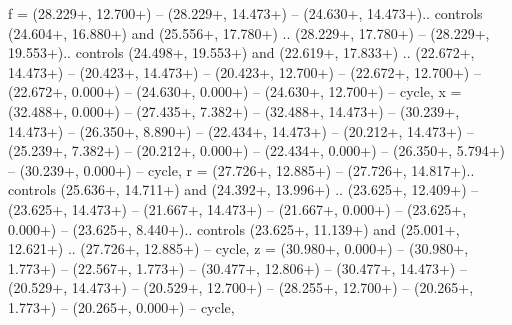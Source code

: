 {f} = {(28.229+\ctpXshift, 12.700+\ctpYshift) -- (28.229+\ctpXshift, 14.473+\ctpYshift) -- (24.630+\ctpXshift, 14.473+\ctpYshift).. controls (24.604+\ctpXshift, 16.880+\ctpYshift) and (25.556+\ctpXshift, 17.780+\ctpYshift) .. (28.229+\ctpXshift, 17.780+\ctpYshift) -- (28.229+\ctpXshift, 19.553+\ctpYshift).. controls (24.498+\ctpXshift, 19.553+\ctpYshift) and (22.619+\ctpXshift, 17.833+\ctpYshift) .. (22.672+\ctpXshift, 14.473+\ctpYshift) -- (20.423+\ctpXshift, 14.473+\ctpYshift) -- (20.423+\ctpXshift, 12.700+\ctpYshift) -- (22.672+\ctpXshift, 12.700+\ctpYshift) -- (22.672+\ctpXshift, 0.000+\ctpYshift) -- (24.630+\ctpXshift, 0.000+\ctpYshift) -- (24.630+\ctpXshift, 12.700+\ctpYshift) -- cycle},
{x} = {(32.488+\ctpXshift, 0.000+\ctpYshift) -- (27.435+\ctpXshift, 7.382+\ctpYshift) -- (32.488+\ctpXshift, 14.473+\ctpYshift) -- (30.239+\ctpXshift, 14.473+\ctpYshift) -- (26.350+\ctpXshift, 8.890+\ctpYshift) -- (22.434+\ctpXshift, 14.473+\ctpYshift) -- (20.212+\ctpXshift, 14.473+\ctpYshift) -- (25.239+\ctpXshift, 7.382+\ctpYshift) -- (20.212+\ctpXshift, 0.000+\ctpYshift) -- (22.434+\ctpXshift, 0.000+\ctpYshift) -- (26.350+\ctpXshift, 5.794+\ctpYshift) -- (30.239+\ctpXshift, 0.000+\ctpYshift) -- cycle},
{r} = {(27.726+\ctpXshift, 12.885+\ctpYshift) -- (27.726+\ctpXshift, 14.817+\ctpYshift).. controls (25.636+\ctpXshift, 14.711+\ctpYshift) and (24.392+\ctpXshift, 13.996+\ctpYshift) .. (23.625+\ctpXshift, 12.409+\ctpYshift) -- (23.625+\ctpXshift, 14.473+\ctpYshift) -- (21.667+\ctpXshift, 14.473+\ctpYshift) -- (21.667+\ctpXshift, 0.000+\ctpYshift) -- (23.625+\ctpXshift, 0.000+\ctpYshift) -- (23.625+\ctpXshift, 8.440+\ctpYshift).. controls (23.625+\ctpXshift, 11.139+\ctpYshift) and (25.001+\ctpXshift, 12.621+\ctpYshift) .. (27.726+\ctpXshift, 12.885+\ctpYshift) -- cycle},
{z} = {(30.980+\ctpXshift, 0.000+\ctpYshift) -- (30.980+\ctpXshift, 1.773+\ctpYshift) -- (22.567+\ctpXshift, 1.773+\ctpYshift) -- (30.477+\ctpXshift, 12.806+\ctpYshift) -- (30.477+\ctpXshift, 14.473+\ctpYshift) -- (20.529+\ctpXshift, 14.473+\ctpYshift) -- (20.529+\ctpXshift, 12.700+\ctpYshift) -- (28.255+\ctpXshift, 12.700+\ctpYshift) -- (20.265+\ctpXshift, 1.773+\ctpYshift) -- (20.265+\ctpXshift, 0.000+\ctpYshift) -- cycle},
